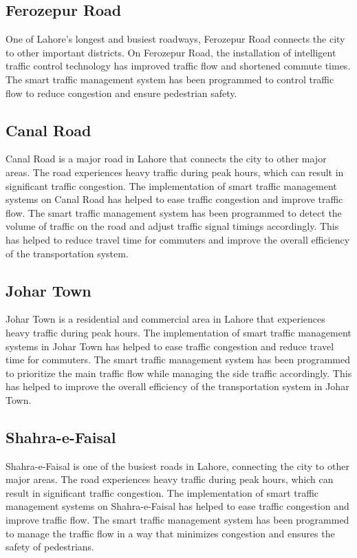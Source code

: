 \documentclass[12pt,a4paper]{article}
\begin{document}
\subsection{Ferozepur Road}
	One of Lahore's longest and busiest roadways, Ferozepur Road connects the city to other important districts. On Ferozepur Road, the installation of intelligent traffic control technology has improved traffic flow and shortened commute times. The smart traffic management system has been programmed to control traffic flow to reduce congestion and ensure pedestrian safety.
	
\subsection{Canal Road}
	Canal Road is a major road in Lahore that connects the city to other major areas. The road experiences heavy traffic during peak hours, which can result in significant traffic congestion. The implementation of smart traffic management systems on Canal Road has helped to ease traffic congestion and improve traffic flow. The smart traffic management system has been programmed to detect the volume of traffic on the road and adjust traffic signal timings accordingly. This has helped to reduce travel time for commuters and improve the overall efficiency of the transportation system.
\subsection{Johar Town}
	Johar Town is a residential and commercial area in Lahore that experiences heavy traffic during peak hours. The implementation of smart traffic management systems in Johar Town has helped to ease traffic congestion and reduce travel time for commuters. The smart traffic management system has been programmed to prioritize the main traffic flow while managing the side traffic accordingly. This has helped to improve the overall efficiency of the transportation system in Johar Town.
	
\subsection{Shahra-e-Faisal}
	Shahra-e-Faisal is one of the busiest roads in Lahore, connecting the city to other major areas. The road experiences heavy traffic during peak hours, which can result in significant traffic congestion. The implementation of smart traffic management systems on Shahra-e-Faisal has helped to ease traffic congestion and improve traffic flow. The smart traffic management system has been programmed to manage the traffic flow in a way that minimizes congestion and ensures the safety of pedestrians.
\end{document}
